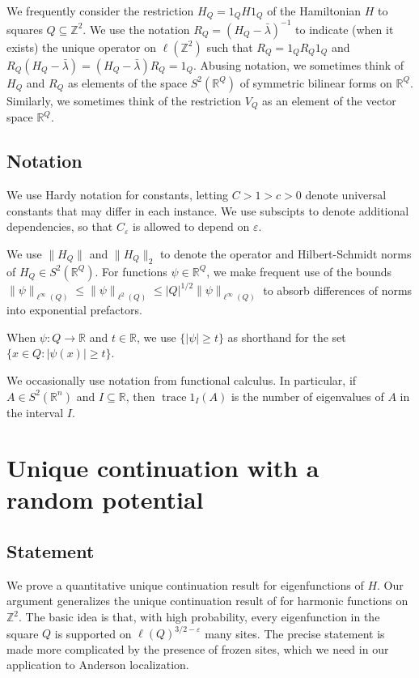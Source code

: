 \documentclass{amsart}
\numberwithin{equation}{section}
\numberwithin{figure}{section}
\newcommand{\Z}{\mathbb{Z}}
\newcommand{\R}{\mathbb{R}}
\newcommand{\ep}{\varepsilon}
\newcommand{\id}{1}
\newcommand{\trace}{\operatorname{trace}}
\begin{document}
We frequently consider the restriction $H_Q = \id_Q H \id_Q$ of the Hamiltonian $H$ to squares $Q \subseteq \Z^2$.  We use the notation $R_Q = (H_Q - \bar \lambda)^{-1}$ to indicate (when it exists) the unique operator on $\ell(\Z^2)$ such that $R_Q = \id_Q R_Q \id_Q$ and $R_Q (H_Q - \bar \lambda) = (H_Q - \bar \lambda) R_Q = \id_Q$.  Abusing notation, we sometimes think of $H_Q$ and $R_Q$ as elements of the space $S^2(\R^Q)$ of symmetric bilinear forms on $\R^Q$.  Similarly, we sometimes think of the restriction $V_Q$ as an element of the vector space $\R^Q$.

\subsection{Notation}

We use Hardy notation for constants, letting $C > 1 > c > 0$ denote universal constants that may differ in each instance.  We use subscipts to denote additional dependencies, so that $C_\ep$ is allowed to depend on $\ep$.

We use $\| H_Q \|$ and $\| H_Q \|_2$ to denote the operator and Hilbert-Schmidt norms of $H_Q \in S^2(\R^Q)$.  For functions $\psi \in \R^Q$, we make frequent use of the bounds $\| \psi \|_{\ell^\infty(Q)} \leq \| \psi \|_{\ell^2(Q)} \leq |Q|^{1/2} \| \psi \|_{\ell^\infty(Q)}$ to absorb differences of norms into exponential prefactors.

When $\psi : Q \to \R$ and $t \in \R$, we use $\{ |\psi| \geq t \}$ as shorthand for the set $\{ x \in Q : |\psi(x)| \geq t \}$.

We occasionally use notation from functional calculus.  In particular, if $A \in S^2(\R^n)$ and $I \subseteq \R$, then $\trace \id_I(A)$ is the number of eigenvalues of $A$ in the interval $I$.

\section{Unique continuation with a random potential}

\subsection{Statement}

We prove a quantitative unique continuation result for eigenfunctions of $H$.  Our argument generalizes the unique continuation result of  \cite{Buhovsky-Logunov-Malinnikova-Sodin} for harmonic functions on $\Z^2$.  The basic idea is that, with high probability, every eigenfunction in the square $Q$ is supported on $\ell(Q)^{3/2-\ep}$ many sites.  The precise statement is made more complicated by the presence of frozen sites, which we need in our application to Anderson localization.
\end{document}

